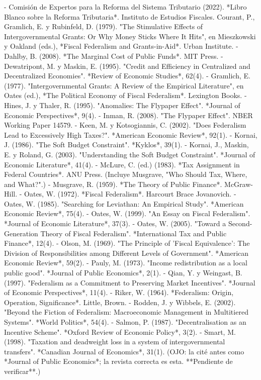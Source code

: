 \documentclass[10pt,a4paper]{article}
\begin{document}
{- Comisión de Expertos para la Reforma del Sistema Tributario (2022). *Libro Blanco sobre la Reforma Tributaria*. Instituto de Estudios Fiscales.
Courant, P., Gramlich, E. y Rubinfeld, D. (1979). "The Stimulative Effects of Intergovernmental Grants: Or Why Money Sticks Where It Hits", en Mieszkowski y Oakland (eds.), *Fiscal Federalism and Grants-in-Aid*. Urban Institute.
- Dahlby, B. (2008). *The Marginal Cost of Public Funds*. MIT Press.
- Dewatripont, M. y Maskin, E. (1995). "Credit and Efficiency in Centralized and Decentralized Economies". *Review of Economic Studies*, 62(4).
- Gramlich, E. (1977). "Intergovernmental Grants: A Review of the Empirical Literature", en Oates (ed.), *The Political Economy of Fiscal Federalism*. Lexington Books.
- Hines, J. y Thaler, R. (1995). "Anomalies: The Flypaper Effect". *Journal of Economic Perspectives*, 9(4).
- Inman, R. (2008). "The Flypaper Effect". NBER Working Paper 14579.
- Keen, M. y Kotsogiannis, C. (2002). "Does Federalism Lead to Excessively High Taxes?". *American Economic Review*, 92(1).
- Kornai, J. (1986). "The Soft Budget Constraint". *Kyklos*, 39(1).
- Kornai, J., Maskin, E. y Roland, G. (2003). "Understanding the Soft Budget Constraint". *Journal of Economic Literature*, 41(4).
- McLure, C. (ed.) (1983). *Tax Assignment in Federal Countries*. ANU Press. (Incluye Musgrave, "Who Should Tax, Where, and What?".)
- Musgrave, R. (1959). *The Theory of Public Finance*. McGraw-Hill.
- Oates, W. (1972). *Fiscal Federalism*. Harcourt Brace Jovanovich.
- Oates, W. (1985). "Searching for Leviathan: An Empirical Study". *American Economic Review*, 75(4).
- Oates, W. (1999). "An Essay on Fiscal Federalism". *Journal of Economic Literature*, 37(3).
- Oates, W. (2005). "Toward a Second-Generation Theory of Fiscal Federalism". *International Tax and Public Finance*, 12(4).
- Olson, M. (1969). "The Principle of 'Fiscal Equivalence': The Division of Responsibilities among Different Levels of Government". *American Economic Review*, 59(2).
- Pauly, M. (1973). "Income redistribution as a local public good". *Journal of Public Economics*, 2(1).
- Qian, Y. y Weingast, B. (1997). "Federalism as a Commitment to Preserving Market Incentives". *Journal of Economic Perspectives*, 11(4).
- Riker, W. (1964). *Federalism: Origin, Operation, Significance*. Little, Brown.
- Rodden, J. y Wibbels, E. (2002). "Beyond the Fiction of Federalism: Macroeconomic Management in Multitiered Systems". *World Politics*, 54(4).
- Salmon, P. (1987). "Decentralisation as an Incentive Scheme". *Oxford Review of Economic Policy*, 3(2).
- Smart, M. (1998). "Taxation and deadweight loss in a system of intergovernmental transfers". *Canadian Journal of Economics*, 31(1). (OJO: la cité antes como *Journal of Public Economics*; la revista correcta es esta. **Pendiente de verificar**.)
}
\end{document}
